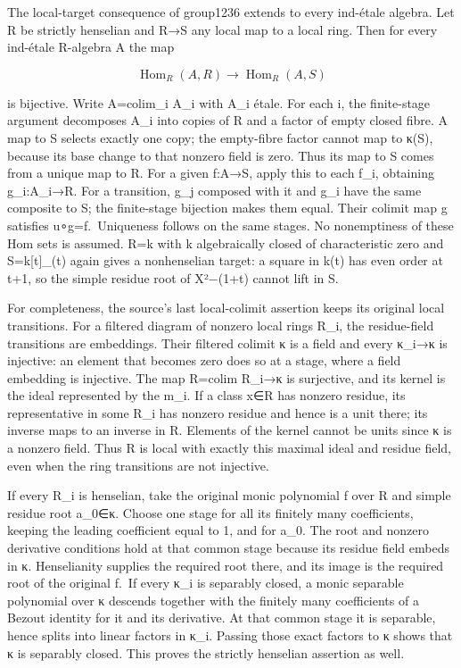 The local-target consequence of group1236 extends to every ind-étale algebra. Let R be strictly henselian and R→S any local map to a local ring. Then for every ind-étale R-algebra A the map

\[
\operatorname{Hom}_R(A,R)\longrightarrow\operatorname{Hom}_R(A,S)
\]

is bijective. Write A=colim\_i A\_i with A\_i étale. For each i, the finite-stage argument decomposes A\_i into copies of R and a factor of empty closed fibre. A map to S selects exactly one copy; the empty-fibre factor cannot map to κ(S), because its base change to that nonzero field is zero. Thus its map to S comes from a unique map to R. For a given f:A→S, apply this to each f\_i, obtaining g\_i:A\_i→R. For a transition, g\_j composed with it and g\_i have the same composite to S; the finite-stage bijection makes them equal. Their colimit map g satisfies u∘g=f.~Uniqueness follows on the same stages. No nonemptiness of these Hom sets is assumed. R=k with k algebraically closed of characteristic zero and S=k{[}t{]}\_(t) again gives a nonhenselian target: a square in k(t) has even order at t+1, so the simple residue root of X²−(1+t) cannot lift in S.

For completeness, the source's last local-colimit assertion keeps its original local transitions. For a filtered diagram of nonzero local rings R\_i, the residue-field transitions are embeddings. Their filtered colimit κ is a field and every κ\_i→κ is injective: an element that becomes zero does so at a stage, where a field embedding is injective. The map R=colim R\_i→κ is surjective, and its kernel is the ideal represented by the m\_i. If a class x∈R has nonzero residue, its representative in some R\_i has nonzero residue and hence is a unit there; its inverse maps to an inverse in R. Elements of the kernel cannot be units since κ is a nonzero field. Thus R is local with exactly this maximal ideal and residue field, even when the ring transitions are not injective.

If every R\_i is henselian, take the original monic polynomial f over R and simple residue root a\_0∈κ. Choose one stage for all its finitely many coefficients, keeping the leading coefficient equal to 1, and for a\_0. The root and nonzero derivative conditions hold at that common stage because its residue field embeds in κ. Henselianity supplies the required root there, and its image is the required root of the original f.~If every κ\_i is separably closed, a monic separable polynomial over κ descends together with the finitely many coefficients of a Bezout identity for it and its derivative. At that common stage it is separable, hence splits into linear factors in κ\_i. Passing those exact factors to κ shows that κ is separably closed. This proves the strictly henselian assertion as well.

